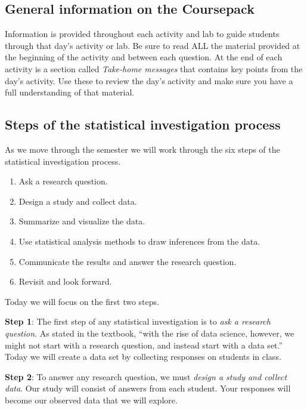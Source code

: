 \documentclass[
]{report}
\begin{document}
\subsection{General information on the Coursepack}\label{general-information-on-the-coursepack}

Information is provided throughout each activity and lab to guide students through that day's activity or lab. Be sure to read ALL the material provided at the beginning of the activity and between each question. At the end of each activity is a section called \emph{Take-home messages} that contains key points from the day's activity. Use these to review the day's activity and make sure you have a full understanding of that material.

\subsection{Steps of the statistical investigation process}\label{steps-of-the-statistical-investigation-process}

As we move through the semester we will work through the six steps of the statistical investigation process.

\begin{enumerate}
\def\labelenumi{\arabic{enumi}.}
\item
  Ask a research question.
\item
  Design a study and collect data.
\item
  Summarize and visualize the data.
\item
  Use statistical analysis methods to draw inferences from the data.
\item
  Communicate the results and answer the research question.
\item
  Revisit and look forward.
\end{enumerate}

Today we will focus on the first two steps.

\textbf{Step 1}: The first step of any statistical investigation is to \emph{ask a research question}. As stated in the textbook, ``with the rise of data science, however, we might not start with a research question, and instead start with a data set.'' Today we will create a data set by collecting responses on students in class.

\textbf{Step 2}: To answer any research question, we must \emph{design a study and collect data}. Our study will consist of answers from each student. Your responses will become our observed data that we will explore.
\end{document}

